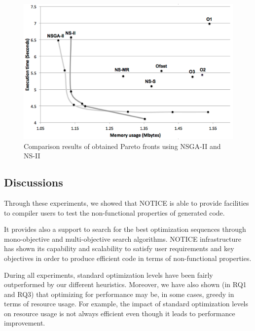 \begin{figure}[h]
		\centering
		\includegraphics[width=0.9\linewidth]{chapitre3/fig/pareto.pdf}
		\caption{Comparison results of obtained Pareto fronts using NSGA-II and NS-II}
		\label{fig:pareto.pdf}
\end{figure}
	
	
\noindent{}
		
\subsection{Discussions}
Through these experiments, we showed that NOTICE is able to provide facilities to compiler users to test the non-functional properties of generated code. 

It provides also a support to search for the best optimization sequences through mono-objective and multi-objective search algorithms. NOTICE infrastructure has shown its capability and scalability to satisfy user requirements and key objectives in order to produce efficient code in terms of non-functional properties. 

During all experiments, standard optimization levels have been fairly outperformed by our different heuristics. 
Moreover, we have also shown (in RQ1 and RQ3) that optimizing for performance may be, in some cases, greedy in terms of resource usage. For example, the impact of standard optimization levels on resource usage is not always efficient even though it leads to performance improvement. 

